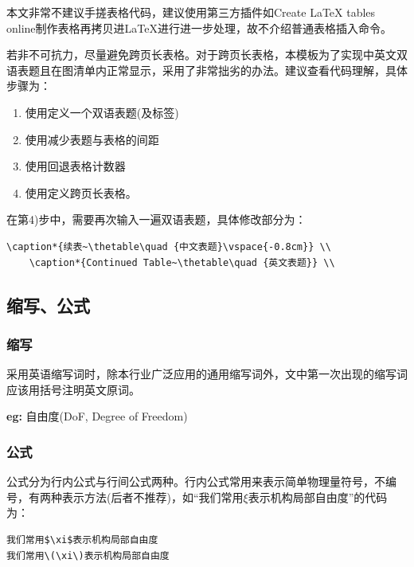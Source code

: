 本文非常不建议手搓表格代码，建议使用第三方插件如Create LaTeX tables online\cite{TabCreateLaTeXta}制作表格再拷贝进\LaTeX{}进行进一步处理，故不介绍普通表格插入命令。

若非不可抗力，尽量避免跨页长表格。对于跨页长表格，本模板为了实现中英文双语表题且在图清单内正常显示，采用了非常拙劣的办法。建议查看代码理解，具体步骤为：
\begin{enumerate}
    \item 使用定义一个双语表题(及标签)
    \item 使用减少表题与表格的间距
    \item 使用回退表格计数器
    \item 使用定义跨页长表格。
\end{enumerate}
在第4)步中，需要再次输入一遍双语表题，具体修改部分为：

\begin{lstlisting}[language={[LaTeX]TeX}]
    \caption*{续表~\thetable\quad {中文表题}\vspace{-0.8cm}} \\
    \caption*{Continued Table~\thetable\quad {英文表题}} \\
\end{lstlisting}

\subsection{缩写、公式}

\subsubsection{缩写}
采用英语缩写词时，除本行业广泛应用的通用缩写词外，文中第一次出现的缩写词应该用括号注明英文原词。

\textbf{eg:} 自由度(DoF, Degree of Freedom)

\subsubsection{公式}
公式分为行内公式与行间公式两种。行内公式常用来表示简单物理量符号，不编号，有两种表示方法(后者不推荐)，如“我们常用$\xi$表示机构局部自由度”的代码为：
\begin{lstlisting}[language={[LaTeX]TeX}]
我们常用$\xi$表示机构局部自由度
我们常用\(\xi\)表示机构局部自由度
\end{lstlisting}

